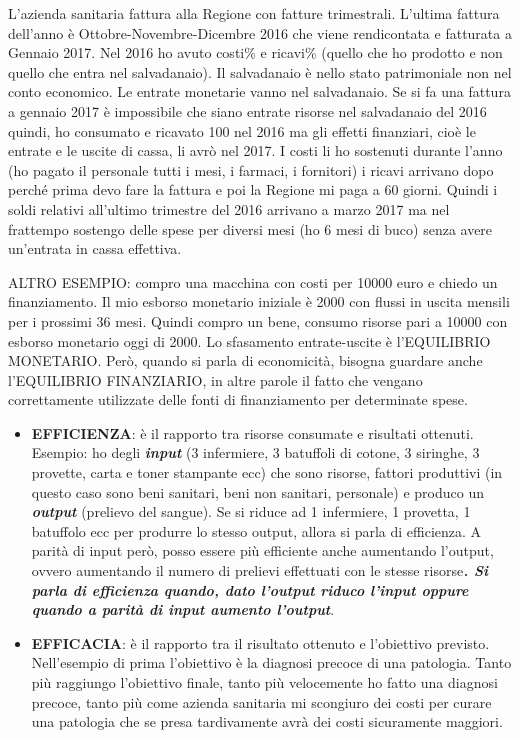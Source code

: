 \documentclass[]{article}
\begin{document}
L'azienda sanitaria fattura alla Regione con fatture trimestrali.
L'ultima fattura dell'anno è Ottobre-Novembre-Dicembre 2016 che viene
rendicontata e fatturata a Gennaio 2017. Nel 2016 ho avuto costi\% e
ricavi\% (quello che ho prodotto e non quello che entra nel
salvadanaio). Il salvadanaio è nello stato patrimoniale non nel conto
economico. Le entrate monetarie vanno nel salvadanaio. Se si fa una
fattura a gennaio 2017 è impossibile che siano entrate risorse nel
salvadanaio del 2016 quindi, ho consumato e ricavato 100 nel 2016 ma gli
effetti finanziari, cioè le entrate e le uscite di cassa, li avrò nel
2017. I costi li ho sostenuti durante l'anno (ho pagato il personale
tutti i mesi, i farmaci, i fornitori) i ricavi arrivano dopo perché
prima devo fare la fattura e poi la Regione mi paga a 60 giorni. Quindi
i soldi relativi all'ultimo trimestre del 2016 arrivano a marzo 2017 ma
nel frattempo sostengo delle spese per diversi mesi (ho 6 mesi di buco)
senza avere un'entrata in cassa effettiva.

ALTRO ESEMPIO: compro una macchina con costi per 10000 euro e chiedo un
finanziamento. Il mio esborso monetario iniziale è 2000 con flussi in
uscita mensili per i prossimi 36 mesi. Quindi compro un bene, consumo
risorse pari a 10000 con esborso monetario oggi di 2000. Lo sfasamento
entrate-uscite è l'EQUILIBRIO MONETARIO. Però, quando si parla di
economicità, bisogna guardare anche l'EQUILIBRIO FINANZIARIO, in altre
parole il fatto che vengano correttamente utilizzate delle fonti di
finanziamento per determinate spese.

\begin{itemize}
\item
  \textbf{EFFICIENZA}: è il rapporto tra risorse consumate e risultati
  ottenuti. Esempio: ho degli \emph{\textbf{input}} (3 infermiere, 3
  batuffoli di cotone, 3 siringhe, 3 provette, carta e toner stampante
  ecc) che sono risorse, fattori produttivi (in questo caso sono beni
  sanitari, beni non sanitari, personale) e produco un
  \emph{\textbf{output}} (prelievo del sangue). Se si riduce ad 1
  infermiere, 1 provetta, 1 batuffolo ecc per produrre lo stesso output,
  allora si parla di efficienza. A parità di input però, posso essere
  più efficiente anche aumentando l'output, ovvero aumentando il numero
  di prelievi effettuati con le stesse risorse\textbf{\emph{. Si parla
  di efficienza quando, dato l'output riduco l'input oppure quando a
  parità di input aumento l'output}}.
\item
  \textbf{EFFICACIA}: è il rapporto tra il risultato ottenuto e
  l'obiettivo previsto. Nell'esempio di prima l'obiettivo è la diagnosi
  precoce di una patologia. Tanto più raggiungo l'obiettivo finale,
  tanto più velocemente ho fatto una diagnosi precoce, tanto più come
  azienda sanitaria mi scongiuro dei costi per curare una patologia che
  se presa tardivamente avrà dei costi sicuramente maggiori.
\end{itemize}
\end{document}

